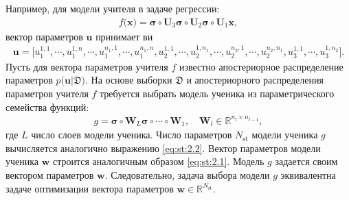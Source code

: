 Например, для модели учителя в задаче регрессии:
\[
\label{eq:st:3}
\begin{aligned}
f\bigr(\mathbf{x}\bigr) = \bm{\sigma} \circ \mathbf{U}_3 \bm{\sigma} \circ \mathbf{U}_2\bm{\sigma}\circ \mathbf{U}_1\mathbf{x},
\end{aligned}
\]
вектор параметров $\mathbf{u}$ принимает ви
\[
\label{eq:st:4}
\begin{aligned}
\mathbf{u} = \bigr[u_1^{1,1}, \cdots, u_1^{1,n},
                                               \cdots, 
                             u_1^{n_1,1}, \cdots, u_1^{n_1,n},  
                             u_2^{1, 1}, \cdots, u_2^{1, n_1}, 
                                                \cdots, 
                            u_2^{n_2, 1}, \cdots, u_2^{n_2, n_1},
                            u_3^{1, 1}, \cdots, u_3^{1, n_2}\bigr].
\end{aligned}
\]
Пусть для вектора параметров учителя $f$ известно апостериорное распределение параметров $p\bigr(\mathbf{u}|\mathfrak{D}\bigr)$. 
На основе выборки $\mathfrak{D}$ и апостериорного распределения параметров учителя $f$ требуется выбрать модель ученика из параметрического семейства функций:
\[
\label{eq:st:5}
\begin{aligned}
g = \bm{\sigma} \circ \mathbf{W}_L\bm{\sigma}  \circ \cdots \circ \mathbf{W}_1, \quad \mathbf{W}_l \in \mathbb{R}^{n_l \times n_{l-1}},
\end{aligned}
\]
где $L$ число слоев модели ученика.
Число параметров $N_{\text{st}}$ модели ученика $g$ вычисляется аналогично выражению \eqref{eq:st:2.2}.
Вектор параметров модели ученика $\mathbf{w}$ строится аналогичным образом \eqref{eq:st:2.1}.
Модель $g$ задается своим вектором параметров $\mathbf{w}$.
Следовательно, задача выбора модели $g$ эквивалентна задаче оптимизации вектора параметров $\mathbf{w}\in\mathbb{R}^{N_{\text{st}}}$.

